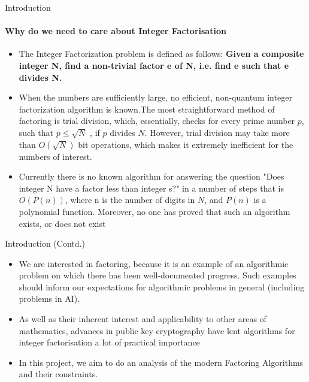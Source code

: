 \documentclass{beamer}
\begin{document}
\begin{frame}{Introduction}
\framesubtitle{Why do we need to care about Integer Factorisation}
\begin{itemize}
    \item The Integer Factorization problem is defined as follows:
    \textbf{Given a composite integer N, find a non-trivial factor e of N, i.e. find e such that e divides N.}
    \item When the numbers are sufficiently large, no efficient, non-quantum integer factorization algorithm is known.The most straightforward method of factoring is trial division, which, essentially, checks for every prime number $p$, such that $p \leq \sqrt{N}$ , if $p$ divides $N$. However, trial division may take more than $O\left( \sqrt {N}\right) $ bit operations, which makes it extremely inefficient for the numbers of interest.
    \item Currently there is no known algorithm for answering the question "Does integer N have a factor less than integer s?" in a number of steps that is $O\left( P\left( n\right) \right)$, where n is the number of digits in $N$, and $P\left(n\right)$ is a polynomial function. Moreover, no one has proved that such an algorithm exists, or does not exist
    
\end{itemize}
\end{frame}
\begin{frame}{Introduction (Contd.)}
   \begin{itemize}
       \item We are interested in factoring, because it is an example of an algorithmic problem on which there has been well-documented progress. Such examples should inform our expectations for algorithmic problems in general (including problems in AI).
        \item As well as their inherent interest and applicability to other areas of mathematics, advances in public key cryptography have lent algorithms for integer factorisation a lot of practical importance
       \item In this project, we aim to do an analysis of the modern Factoring Algorithms and their constraints.
\end{itemize}
\end{frame}
\end{document}
